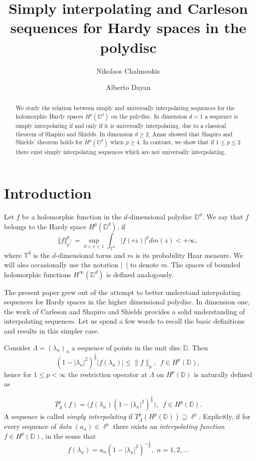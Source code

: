 \documentclass{amsart}
\title{Simply interpolating and Carleson sequences for Hardy spaces in the polydisc}
\author{Nikolaos Chalmoukis
\orcidlink{0000-0001-5210-8206}
}
\author{Alberto Dayan \orcidlink{0000-0002-7346-4354}
}
\date{}
\numberwithin{equation}{section}
\newcommand{\D}{\mathbb{D}}
\begin{document}
\begin{abstract}
    We study the relation between simply and universally interpolating sequences for the holomorphic Hardy spaces $H^p(\mathbb{D}^d)$ on the polydisc. In dimension $d=1$ a sequence is simply interpolating if and only if it is universally interpolating, due to a classical theorem of Shapiro and Shields. In dimension $d\ge2$, Amar showed that Shapiro and Shields' theorem holds for $H^p(\mathbb{D}^d)$ when $p \geq 4$. In contrast, we  show that if $1\leq p \leq 2$ there exist simply interpolating sequences which are not universally interpolating. 
\end{abstract}
\maketitle
\section{Introduction}
Let $ f $ be a holomorphic function in the $d$-dimensional polydisc $\mathbb{D}^d$.
We say that $f$ belongs to the Hardy space $H^p(\mathbb{D}^d)$, if  
\[ \Vert f\Vert_p^p : = \sup_{0<r<1} \int_{\mathbb{T}^d}|f(rz)|^pdm(z)<+\infty,   \]
where $\mathbb{T}^d$ is the $d$-dimensional torus and $m$ is its probability Haar measure. We will also occasionally use the notation $|\,\,\, |$ to denote $m.$
The spaces of bounded holomorphic functions $H^\infty(\mathbb{D}^d)$ is defined analogously.

The present paper grew out of the attempt to better understand interpolating sequences for Hardy spaces in the higher dimensional polydisc. 
In dimension one, the work of Carleson \cite{Carleson58} and Shapiro and Shields \cite{SS61} provides a solid understanding of interpolating sequences. 
Let us spend a few words to recall the basic definitions and results in this simpler case. 

Consider $\Lambda = (\lambda_n)_n$ a sequence of points in the unit disc $\D$. Then
\[
(1-|\lambda_n|^2)^{\frac1p}|f(\lambda_n)|\le \|f\|_p, \,\,\, f\in H^p(\D),
\]
hence for $1\leq p < \infty$ the restriction operator at $\Lambda$ on $H^p(\D)$ is naturally defined as 

\[ T^p_\Lambda(f) = \big( f(\lambda_n)(1-|\lambda_n|^2)^{\frac1p} \big), \,\,\, f\in H^p(\mathbb{D}).  \]
A sequence is called {\it simply interpolating} if $T_\Lambda^p(H^p(\mathbb{D})) \supseteq \ell^p$. Explicitly, if for every sequence of {\it data} $ ( a_n ) \in \ell^p $ there exists an {\it interpolating function} $f\in H^p(\mathbb{D})$, 
in the sense that 
\begin{equation}\label{eq_interpolation}
	f(\lambda_n) = a_n(1-|\lambda_n|^2)^{-\frac1p}, \,\, n = 1,2,\dots
\end{equation}
\end{document}
